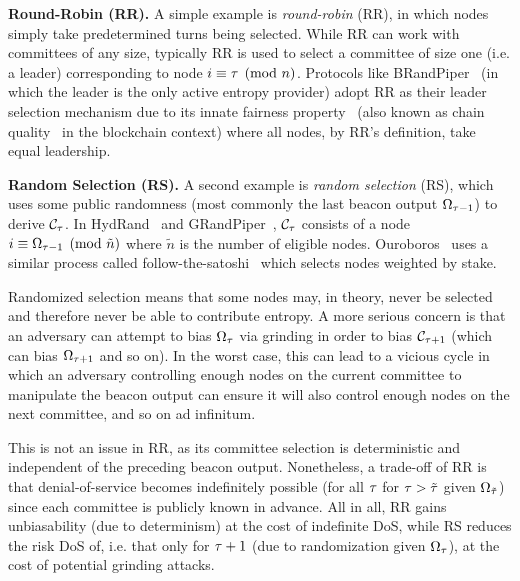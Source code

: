 \noindent\textbf{Round-Robin (RR).} A simple example is \textit{round-robin} (RR), in which nodes simply take predetermined turns being selected. While RR can work with committees of any size, typically RR is used to select a committee of size one (i.e. a leader) corresponding to node $i \equiv \tau \pmod n$. Protocols like BRandPiper~\cite{bhat2020randpiper} (in which the \epoch leader is the only active entropy provider) adopt RR as their leader selection mechanism due to its innate fairness property~\cite{azouvi2018winning} (also known as chain quality~\cite{garay2015bitcoin} in the blockchain context) where all nodes, by RR's definition, take equal leadership.

\noindent\textbf{Random Selection (RS).} A second example is \textit{random selection} (RS), which uses some public randomness (most commonly the last beacon output $\Omega_{\tau - 1}$) to derive $\mathcal{C}_\tau$.
In HydRand~\cite{schindler2020hydrand} and GRandPiper~\cite{bhat2020randpiper}, $\mathcal{C}_\tau$ consists of a node $i \equiv \Omega_{\tau - 1} \pmod{\tilde{n}}$ where $\tilde{n}$ is the number of eligible nodes. Ouroboros~\cite{kiayias2017ouroboros} uses a similar process called follow-the-satoshi~\cite{bentov2014proof,kiayias2017ouroboros} which selects nodes weighted by stake.

Randomized selection means that some nodes may, in theory, never be selected and therefore never be able to contribute entropy. A more serious concern is that an adversary can attempt to bias $\Omega_\tau$ via grinding in order to bias $\mathcal{C}_{\tau + 1}$ (which can bias $\Omega_{\tau + 1}$ and so on). In the worst case, this can lead to a vicious cycle in which an adversary controlling enough nodes on the current committee to manipulate the beacon output can ensure it will also control enough nodes on the next committee, and so on ad infinitum.

This is not an issue in RR, as its committee selection is deterministic and independent of the preceding beacon output. Nonetheless, a trade-off of RR is that denial-of-service becomes indefinitely possible (for all \epochs $\tau$ for $\tau > \tilde{\tau}$ given $\Omega_{\tilde{\tau}}$) since each committee is publicly known in advance. All in all, RR gains unbiasability (due to determinism) at the cost of indefinite DoS, while RS reduces the risk DoS of, i.e. that only for \epoch $\tau + 1$ (due to randomization given $\Omega_\tau$), at the cost of potential grinding attacks.


